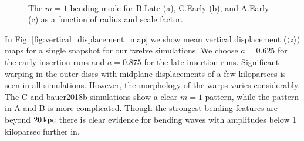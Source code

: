 \begin{figure}\label{fig:binding_m1}
	\centering
	 \\  \caption{The
          $m=1$ bending mode for B.Late (a), C.Early (b), and A.Early
          (c) as a function of radius and scale factor. }
\end{figure}

In Fig. \ref{fig:vertical_displacement_map} we show mean vertical
displacement ($\langle z\rangle$) maps for a single snapshot for our
twelve simulations. We choose $a=0.625$ for the early insertion runs
and $a=0.875$ for the late insertion runs. Significant warping in the
outer discs with midplane displacements of a few kiloparsecs is seen
in all simulations. However, the morphology of the warps varies
considerably. The C and bauer2018b simulations show a clear $m=1$
pattern, while the pattern in A and B is more complicated. Though the
strongest bending features are beyond $20\,{\rm kpc}$ there is clear
evidence for bending waves with amplitudes below 1 kiloparsec further
in.

